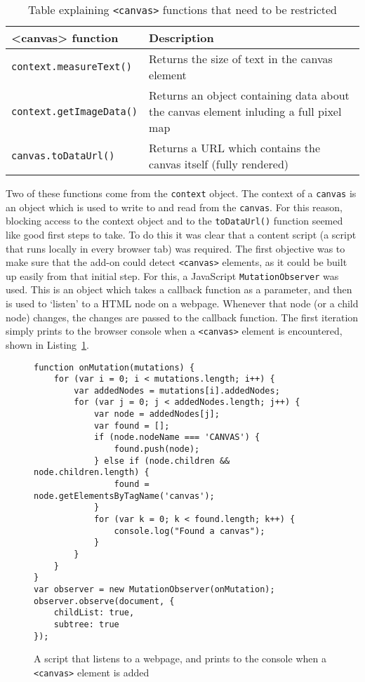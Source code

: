 \begin{table}[h]
\centering
\begin{tabular}{| p{6cm} | p{8cm} |}
    \hline
    \textbf{<canvas> function} & \textbf{Description} \\ \hline
    \texttt{context.measureText()} & {Returns the size of text in the canvas element} \\ \hline
    \texttt{context.getImageData()} & {Returns an object containing data about \newline the canvas element inluding a full pixel map} \\ \hline
    \texttt{canvas.toDataUrl()} & {Returns a URL which contains the canvas \newline itself (fully rendered)} \\
    \hline
\end{tabular}
\caption{Table explaining \texttt{<canvas>} functions that need to be restricted}
\label{tab:canvas-methods}
\end{table}

Two of these functions come from the \texttt{context} object.
The context of a \texttt{canvas} is an object which is used to write to and read from the \texttt{canvas}.
For this reason, blocking access to the context object and to the \texttt{toDataUrl()} function seemed like good first steps to take.
To do this it was clear that a content script (a script that runs locally in every browser tab) was required.
The first objective was to make sure that the add-on could detect \texttt{<canvas>} elements, as it could be built up easily from that initial step.
For this, a JavaScript \texttt{MutationObserver} was used.
This is an object which takes a callback function as a parameter, and then is used to `listen' to a HTML node on a webpage.
Whenever that node (or a child node) changes, the changes are passed to the callback function.
The first iteration simply prints to the browser console when a \texttt{<canvas>} element is encountered, shown in Listing~\ref{lst:canvas-logger}.

\begin{figure}[h]
\begin{lstlisting}
function onMutation(mutations) {
    for (var i = 0; i < mutations.length; i++) {
        var addedNodes = mutations[i].addedNodes;
        for (var j = 0; j < addedNodes.length; j++) {
            var node = addedNodes[j];
            var found = [];
            if (node.nodeName === 'CANVAS') {
                found.push(node);
            } else if (node.children && node.children.length) {
                found = node.getElementsByTagName('canvas');
            }
            for (var k = 0; k < found.length; k++) {
                console.log("Found a canvas");
            }
        }
    }
}
var observer = new MutationObserver(onMutation);
observer.observe(document, {
    childList: true,
    subtree: true
});
\end{lstlisting}
\caption{A script that listens to a webpage, and prints to the console when a \texttt{<canvas>} element is added}
\label{lst:canvas-logger}
\end{figure}

